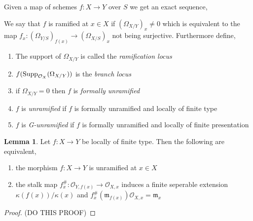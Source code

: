 \documentclass[12pt]{extarticle}
\theoremstyle{definition}
\newtheorem{lemma}[theorem]{Lemma}
\newenvironment{definition}[1][Definition:]{\begin{trivlist}
\item[\hskip \labelsep {\bfseries #1}]}{\end{trivlist}}
\newcommand{\m}{\mathfrak{m}}
\begin{document}
\newcommand{\stalk}[2]{\mathcal{O}_{#1, #2}}
\newcommand{\Spec}[1]{\mathrm{Spec}\left(#1\right)}
\newcommand{\Proj}[1]{\mathrm{Proj}\left(#1\right)}
\newcommand{\mSpec}[1]{\mathrm{mSpec}\left(#1\right)}
\newcommand{\q}{\mathfrak{q}}
\newcommand{\p}{\mathfrak{p}}

\newcommand{\Ann}[2]{\mathrm{Ann}_{#1}\left( #2 \right)}
\newcommand{\Supp}[2]{\mathrm{Supp}_{#1}\left( #2 \right)}

\begin{definition}
Given a map of schemes $f : X \to Y$ over $S$ we get an exact sequence,
\begin{center}
\end{center}
We say that $f$ is ramified at $x \in X$ if $(\Omega_{X / Y})_x \neq 0$ which is equivalent to the map $f_x : (\Omega_{Y / S})_{f(x)} \to (\Omega_{X / S})_x$ not being surjective. Furthermore define,
\begin{enumerate}
\item The support of $\Omega_{X / Y}$ is called the \textit{ramification locus}
\item $f(\mathrm{Supp}_{\mathcal{O}_{X}}(\Omega_{X/Y}))$ is the \textit{branch locus}
\item if $\Omega_{X/Y} = 0$ then $f$ is \textit{formally unramified}
\item $f$ is \textit{unramified} if $f$ is formally unramified and locally of finite type
\item $f$ is \textit{G-unramified} if $f$ is formally unramified and locally of finite presentation 
\end{enumerate}
\end{definition}

\begin{lemma}
Let $f : X \to Y$ be locally of finite type. Then the following are equivalent,
\begin{enumerate}
\item the morphism $f : X \to Y$ is unramified at $x \in X$ 
\item the stalk map $f^\#_x : \stalk{Y}{f(x)} \to \stalk{X}{x}$
induces a finite seperable extension $\kappa(f(x)) / \kappa(x)$ and $f^\#_x(\m_{f(x)})\stalk{X}{x} = \m_x$
\end{enumerate} 
\end{lemma}

\begin{proof}
(DO THIS PROOF)
\end{proof}
\end{document}
